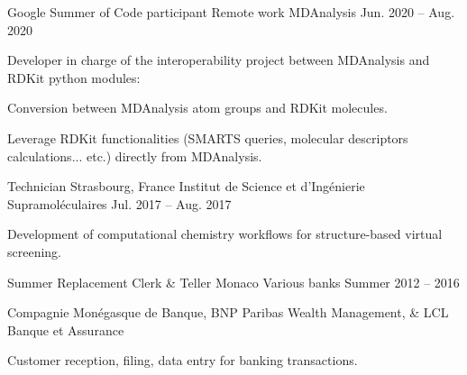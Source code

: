 \begin{minipage}[t]{.02\linewidth}
    \cvsubsection{}
\end{minipage}
% 
\begin{minipage}[t]{.49\linewidth}
% 
    \begin{cventries}
% 
        \cventryvar
            {Google Summer of Code participant}
            {Remote work}
            {MDAnalysis}
            {Jun. 2020 -- Aug. 2020}
            {
            \vspace{-1.2\baselineskip}
            Developer in charge of the interoperability project between MDAnalysis and RDKit python modules: \vspace{1.2\baselineskip}
            \begin{cvitems}
                \item{Conversion between MDAnalysis atom groups and RDKit molecules.}
                \item{Leverage RDKit functionalities (SMARTS queries, molecular descriptors calculations... etc.) directly from MDAnalysis.}
            \end{cvitems}
            \vspace{1em}
            }
% 
        \cventryvar
            {Technician}
            {Strasbourg, France}
            {Institut de Science et d'Ingénierie Supramoléculaires}
            {Jul. 2017 -- Aug. 2017}
            {
            \begin{cvitems}
                \item{Development of computational chemistry workflows for structure-based virtual screening.}
            \end{cvitems}
            \vspace{1em}
            }
% 
        \cventryvar
            {Summer Replacement Clerk \& Teller}
            {Monaco}
            {Various banks}
            {Summer 2012 -- 2016}
            {
            \begin{cvitems}
                \item{Compagnie Monégasque de Banque, BNP Paribas Wealth \mbox{Management}, \& LCL Banque et Assurance}
                \item{Customer reception, filing, data entry for banking transactions.}
            \end{cvitems}
            \vspace{1em}
            }
% 
    \end{cventries}
% 
\end{minipage}